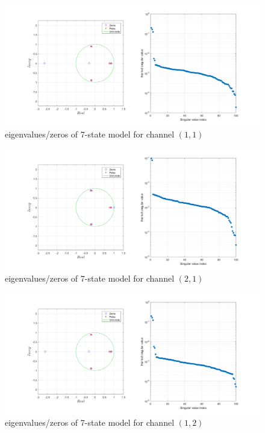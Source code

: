 \documentclass[paper=US leter, fontsize=11pt]{scrartcl}
\begin{document}
\begin{figure}[bh!]  
	\centering    
	\includegraphics[scale=0.38,trim={4.5cm 0 0 0},clip]{task241.png}  
	\caption{eigenvalues/zeros of 7-state model for channel $(1,1)$}
	\label{task241} 
\end{figure} 

\begin{figure}[ht!]  
	\centering    
	\includegraphics[scale=0.38,trim={4.5cm 0 0 0},clip]{task242.png}  
	\caption{eigenvalues/zeros of 7-state model for channel $(2,1)$}
	\label{task242} 
\end{figure} 

\begin{figure}[ht!]  
	\centering    
	\includegraphics[scale=0.38,trim={4.5cm 0 0 0},clip]{task243.png}  
	\caption{eigenvalues/zeros of 7-state model for channel $(1,2)$}
	\label{task243} 
\end{figure} 
\end{document}
